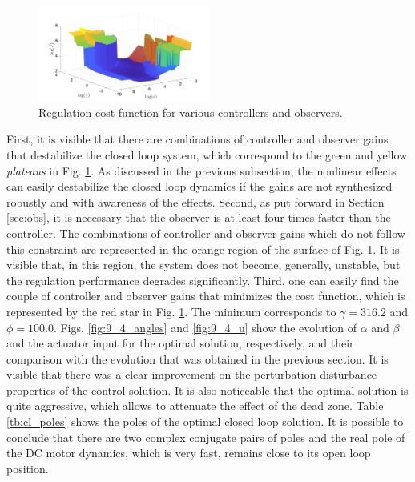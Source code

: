 \documentclass[letterpaper, 10 pt, conference]{ieeeconf}
\begin{document}
\begin{figure}[h]
    \centering
    \includegraphics[width = 0.5\textwidth]{figures/9_5_mesh.png}
    \caption{Regulation cost function for various controllers and observers.}
    \label{fig:9_5_mesh}
\end{figure}

First, it is visible that there are combinations of controller and observer gains that destabilize the closed loop system, which correspond to the green and yellow \textit{plateaus} in Fig. \ref{fig:9_5_mesh}. As discussed in the previous subsection, the nonlinear effects can easily destabilize the closed loop dynamics if the gains are not synthesized robustly and with awareness of the effects. Second, as put forward in Section \ref{sec:obs}, it is necessary that the observer is at least four times faster than the controller. The combinations of controller and observer gains which do not follow this constraint are represented in the orange region of the surface of Fig. \ref{fig:9_5_mesh}. It is visible that, in this region, the system does not become, generally, unstable, but the regulation performance degrades significantly. Third, one can easily find the couple of controller and observer gains that minimizes the cost function, which is represented by the red star in Fig. \ref{fig:9_5_mesh}. The minimum corresponds to $\gamma = 316.2$ and $\phi = 100.0$. Figs. \ref{fig:9_4_angles} and \ref{fig:9_4_u} show the evolution of $\alpha$ and $\beta$ and the actuator input for the optimal solution, respectively, and their comparison with the evolution that was obtained in the previous section. It is visible that there was a clear improvement on the perturbation disturbance properties of the control solution. It is also noticeable that the optimal solution is quite aggressive, which allows to attenuate the effect of the dead zone. Table \ref{tb:cl_poles} shows the poles of the optimal closed loop solution. It is possible to conclude that there are two complex conjugate pairs of poles and the real pole of the DC motor dynamics, which is very fast, remains close to its open loop position.
\end{document}
